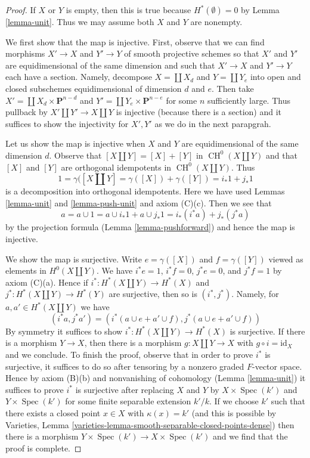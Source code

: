 \documentclass[10pt,a4paper]{amsart}
\theoremstyle{plain}
\theoremstyle{definition}
\theoremstyle{remark}
\numberwithin{equation}{subsection}
\def\Spec{\mathop{\mathrm{Spec}}}
\def\CH{\mathop{\mathrm{CH}}\nolimits}
\begin{document}
\begin{proof}
If $X$ or $Y$ is empty, then this is true because
$H^*(\emptyset) = 0$ by Lemma \ref{lemma-unit}.
Thus we may assume both $X$ and $Y$ are nonempty.

\medskip\noindent
We first show that the map is injective. First, observe that
we can find morphisms $X' \to X$ and $Y' \to Y$
of smooth projective schemes so that $X'$ and $Y'$ are
equidimensional of the same dimension and such that
$X' \to X$ and $Y' \to Y$ each have a section. Namely,
decompose $X = \coprod X_d$ and $Y = \coprod Y_e$
into open and closed subschemes equidimensional of
dimension $d$ and $e$. Then take
$X' = \coprod X_d \times \mathbf{P}^{n - d}$
and $Y' = \coprod Y_e \times \mathbf{P}^{n - e}$ for some
$n$ sufficiently large. Thus pullback by
$X' \amalg Y' \to X \amalg Y$ is injective
(because there is a section) and
it suffices to show the injectivity for $X', Y'$
as we do in the next parapgrah.

\medskip\noindent
Let us show the map is injective when $X$ and $Y$ are equidimensional
of the same dimension $d$.
Observe that $[X \amalg Y] = [X] + [Y]$ in $\CH^0(X \amalg Y)$
and that $[X]$ and $[Y]$ are orthogonal idempotents in $\CH^0(X \amalg Y)$.
Thus
$$
1 = \gamma([X \amalg Y] = \gamma([X]) + \gamma([Y]) = i_*1 + j_*1
$$
is a decomposition into orthogonal idempotents. Here we have used
Lemmas \ref{lemma-unit} and \ref{lemma-push-unit} and axiom (C)(c).
Then we see that
$$
a = a \cup 1 = a \cup i_*1 + a \cup j_*1 =
i_*(i^*a) + j_*(j^*a)
$$
by the projection formula (Lemma \ref{lemma-pushforward}) and hence the map
is injective.

\medskip\noindent
We show the map is surjective. Write $e = \gamma([X])$ and $f = \gamma([Y])$
viewed as elements in $H^0(X \amalg Y)$. We have
$i^*e = 1$, $i^*f = 0$, $j^*e = 0$, and $j^*f = 1$ by axiom (C)(a).
Hence if $i^* : H^*(X \amalg Y) \to  H^*(X)$
and $j^* : H^*(X \amalg Y) \to H^*(Y)$ are surjective, then
so is $(i^*, j^*)$. Namely, for $a, a' \in H^*(X \amalg Y)$
we have
$$
(i^*a, j^*a') = (i^*(a \cup e + a' \cup f), j^*(a \cup e + a' \cup f))
$$
By symmetry it suffices to show $i^* : H^*(X \amalg Y) \to  H^*(X)$
is surjective. If there is a morphism $Y \to X$, then there is a morphism
$g : X \amalg Y \to X$ with $g \circ i = \text{id}_X$ and we conclude.
To finish the proof, observe that in order to prove
$i^*$ is surjective, it suffices to do so after tensoring
by a nonzero graded $F$-vector space. Hence by axiom (B)(b)
and nonvanishing of cohomology (Lemma \ref{lemma-unit})
it suffices to prove $i^*$ is surjective after replacing
$X$ and $Y$ by $X \times \Spec(k')$ and $Y \times \Spec(k')$
for some finite separable extension $k'/k$.
If we choose $k'$ such that there exists a closed point
$x \in X$ with $\kappa(x) = k'$ (and this is possible by
Varieties, Lemma \ref{varieties-lemma-smooth-separable-closed-points-dense})
then there is a morphism $Y \times \Spec(k') \to X \times \Spec(k')$
and we find that the proof is complete.
\end{proof}
\end{document}
